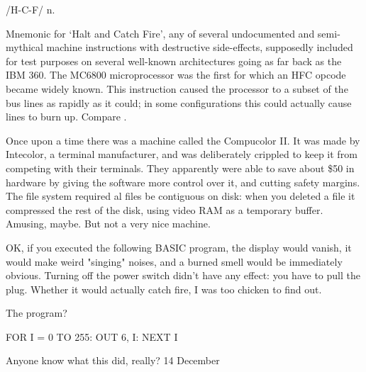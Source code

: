  /H-C-F/ n.

Mnemonic for `Halt and Catch Fire', any of several undocumented and semi-mythical machine instructions with destructive side-effects,
supposedly included for test purposes on several well-known architectures going as far back as the IBM 360. The MC6800 microprocessor was
the first for which an HFC opcode became widely known. This instruction caused the processor to  a subset of the bus
lines as rapidly as it could; in some configurations this could actually cause lines to burn up. Compare .

\begin{new}
	\begin{usenet}
		Once upon a time there was a machine called the Compucolor II. It was made by
		Intecolor, a terminal manufacturer, and was deliberately crippled to keep it
		from competing with their terminals. They apparently were able to save about
		\$50 in hardware by giving the software more control over it, and cutting
		safety margins. The file system required al files be contiguous on disk: when
		you deleted a file it compressed the rest of the disk, using video RAM as a
		temporary buffer. Amusing, maybe. But not a very nice machine.

		OK, if you executed the following BASIC program, the display would vanish, it
		would make weird "singing" noises, and a burned smell would be immediately
		obvious. Turning off the power switch didn't have any effect: you have to 
		pull the plug. Whether it would actually catch fire, I was too chicken to find
		out.

		The program?

		\begin{usenet}
			FOR I = 0 TO 255: OUT 6, I: NEXT I
		\end{usenet}

		Anyone know what this did, really?
			{14 December}
	\end{usenet}
\end{new}

